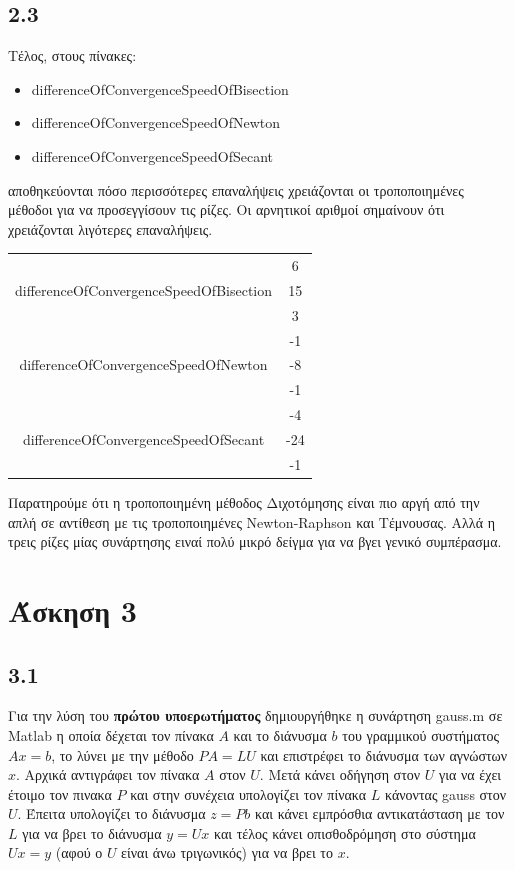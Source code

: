 \documentclass[a4paper,11pt]{article}
\begin{document}
\begin{flushleft}
\subsection*{2.3}
Τέλος, στους πίνακες:
\begin{itemize}
    \item differenceOfConvergenceSpeedOfBisection
    \item differenceOfConvergenceSpeedOfNewton
    \item differenceOfConvergenceSpeedOfSecant
\end{itemize} 
αποθηκεύονται πόσο περισσότερες επαναλήψεις χρειάζονται	οι τροποποιημένες μέθοδοι για να προσεγγίσουν τις ρίζες. 
\linebreak
Οι αρνητικοί αριθμοί σημαίνουν ότι χρειάζονται λιγότερες επαναλήψεις.

\begin{center}
    \begin{tabular}{|c|c|}
        \hline
        \multirow{3}{*}{differenceOfConvergenceSpeedOfBisection} & 6 \\ \cline{2-2} & 15 \\ \cline{2-2} & 3 \\ \hline
        \multirow{3}{*}{differenceOfConvergenceSpeedOfNewton} & -1 \\ \cline{2-2} & -8 \\ \cline{2-2} & -1 \\ \hline
        \multirow{3}{*}{differenceOfConvergenceSpeedOfSecant} & -4 \\ \cline{2-2} & -24 \\ \cline{2-2} & -1 \\ \hline   
    \end{tabular}
\end{center}

Παρατηρούμε ότι η τροποποιημένη μέθοδος Διχοτόμησης είναι πιο αργή από την απλή σε αντίθεση με τις τροποποιημένες Newton-Raphson και Τέμνουσας. Αλλά η τρεις ρίζες μίας συνάρτησης ειναί πολύ μικρό δείγμα για να βγει γενικό συμπέρασμα. 
\pagebreak

\section*{Άσκηση 3}
\subsection*{3.1}
Για την λύση του \textbf{πρώτου υποερωτήματος} δημιουργήθηκε η συνάρτηση gauss.m σε Matlab η οποία δέχεται τον πίνακα $A$ και το διάνυσμα $b$ του γραμμικού συστήματος $Ax = b$, το λύνει με την μέθοδο $PA = LU$ και επιστρέφει το διάνυσμα των αγνώστων $x$.
\linebreak
Αρχικά αντιγράφει τον πίνακα $A$ στον $U$. Μετά κάνει οδήγηση στον $U$ για να έχει έτοιμο τον πινακα $P$ και στην συνέχεια υπολογίζει τον πίνακα $L$ κάνοντας gauss στον $U$. Έπειτα υπολογίζει το διάνυσμα $z = Pb$ και κάνει εμπρόσθια αντικατάσταση με τον $L$ για να βρει το διάνυσμα $y = Ux$ και τέλος κάνει οπισθοδρόμηση στο σύστημα $Ux=y$ (αφού ο $U$ είναι άνω τριγωνικός) για να βρει το $x$.
\linebreak


\end{flushleft}
\end{document}
